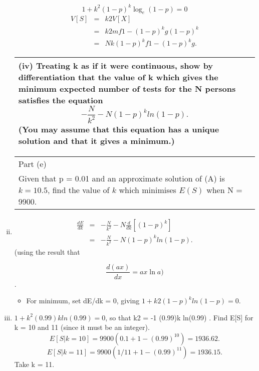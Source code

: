 \documentclass[a4paper,12pt]{article}
\begin{document}
\begin{enumerate}[(i)]
\[ 1 + k^2(1-p)^k\log_e(1-p) = 0\]
\begin{eqnarray*}
V [S] &=& k2V [X] \\ &=& k2mf1 - (1-p)^kg(1-p)^k \\ &=& Nk(1-p)^kf1 - (1-p)^kg.
\end{eqnarray*}
\newpage
  \begin{table}[ht!]
     \centering
     \begin{tabular}{|p{15cm}|}
     \hline  
(iv) Treating k as if it were continuous, show by differentiation that the value of k which gives the minimum expected number of tests for the N persons satisfies the equation
\[-\frac{N}{k^2} - N(1-p)^k ln(1-p).\]
(You may assume that this equation has a unique solution and that it gives a minimum.)
\\ \hline
      \end{tabular}
    \end{table}

  \begin{table}[ht!]
     \centering
     \begin{tabular}{|p{15cm}|}
     \hline  
\noindent Part (e)\\ Given that p = 0.01 and an approximate solution of (A) is $k = 10.5$, find the value of $k$ which minimises $E(S)$ when N = 9900.
\\ \hline
      \end{tabular}
    \end{table}
\item 

\begin{eqnarray*} 
\frac{dE}{dk}
 &=&-\frac{N}{k^2}  - N \frac{d}{dk} \left[ (1-p)^k \right] \\
&=& -\frac{N}{k^2} - N(1-p)^k ln(1-p).
\end{eqnarray*}
(using the result that

\[ \frac{d(ax)}{dx} = ax \ln a)\].
\begin{itemize}
\item For minimum, set dE/dk = 0, giving $1 + k2(1-p)^k ln(1-p) = 0$.
\end{itemize}
\item $1 + k^2(0.99)k ln(0.99) = 0$, so that k2 = -1
(0.99)k ln(0.99) .
Find E[S] for k = 10 and 11 (since it must be an integer).
\[E[S|k = 10] = 9900(0.1 + 1 - (0.99)^{10}) = 1936.62.\]
\[E[S|k = 11] = 9900( 1/11 + 1 - (0.99)^{11}) = 1936.15.\]
Take k = 11.
\end{enumerate}
\end{document}
